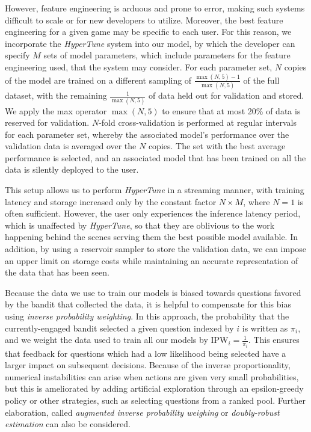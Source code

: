 \documentclass[manuscript, nonacm]{acmart_no_footer}
\begin{document}
However, feature engineering is arduous and prone to error, making such systems difficult to scale or for new developers to utilize. Moreover, the best feature engineering for a given game may be specific to each user. For this reason, we incorporate the \textit{HyperTune} system into our model, by which the developer can specify $M$ sets of model parameters, which include parameters for the feature engineering used, that the system may consider. For each parameter set, $N$ copies of the model are trained on a different sampling of $\frac{\max(N, 5)-1}{\max(N, 5)}$ of the full dataset, with the remaining $\frac{1}{\max(N, 5)}$ of data held out for validation and stored. We apply the max operator $\max(N, 5)$ to ensure that at most 20\% of data is reserved for validation. $N$-fold cross-validation is performed at regular intervals for each parameter set, whereby the associated model's performance over the validation data is averaged over the $N$ copies. The set with the best average performance is selected, and an associated model that has been trained on all the data is silently deployed to the user. 

This setup allows us to perform \textit{HyperTune} in a streaming manner, with training latency and storage increased only by the constant factor $N\times M$,  where $N=1$ is often sufficient. However, the user only experiences the inference latency period, which is unaffected by \textit{HyperTune}, so that they are oblivious to the work happening behind the scenes serving them the best possible model available. In addition, by using a reservoir sampler\cite{reservoir_sampler} to store the validation data, we can impose an upper limit on storage costs while maintaining an accurate representation of the data that has been seen.

Because the data we use to train our models is biased towards questions favored by the bandit that collected the data, it is helpful to compensate for this bias using \textit{inverse probability weighting}\cite{ipw}. In this approach, the probability that the currently-engaged bandit selected a given question indexed by $i$ is written as $\pi_{i}$, and we weight the data used to train all our models by $\text{IPW}_i=\frac{1}{\pi_{i}}$. This ensures that feedback for questions which had a low likelihood being selected have a larger impact on subsequent decisions. Because of the inverse proportionality, numerical instabilities can arise when actions are given very small probabilities, but this is ameliorated by adding artificial exploration through an epsilon-greedy policy or other strategies, such as selecting questions from a ranked pool. Further elaboration, called \textit{augmented inverse probability weighing} or \textit{doubly-robust estimation} can also be considered\cite{doubly_robust_estimators}.
\end{document}
